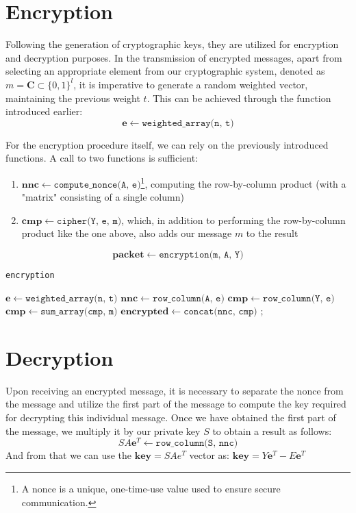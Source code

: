 %
\section{Encryption}

Following the generation of cryptographic keys, they are utilized for encryption and decryption purposes. In the transmission of encrypted messages, apart from selecting an appropriate element from our cryptographic system, denoted as $m = \mathbf{C} \subset \{0,1\}^l $, it is imperative to generate a random weighted vector, maintaining the previous weight $t$. This can be achieved through the function introduced earlier:
$$
\mathbf{e}\leftarrow\texttt{weighted\_array(n, t)}
$$

For the encryption procedure itself, we can rely on the previously introduced functions. A call to two functions is sufficient:
\begin{enumerate}
    \item $\mathbf{nnc} \leftarrow\texttt{compute\_nonce(A, e)}$\footnote{A nonce is a unique, one-time-use value used to ensure secure communication.}, computing the row-by-column product (with a "matrix" consisting of a single column)
    \item $\mathbf{cmp} \leftarrow\texttt{cipher(Y, e, m)}$, which, in addition to performing the row-by-column product like the one above, also adds our message $m$ to the result
\end{enumerate}
$$
\mathbf{packet} \leftarrow\texttt{encryption(m, A, Y)}
$$

\begin{algorithm}[H]
\caption{\texttt{encryption}}
\label{enc}

\DontPrintSemicolon
\SetStartEndCondition{ }{}{}
\AlgoDontDisplayBlockMarkers\SetAlgoNoEnd\SetAlgoNoLine

$\mathbf{e} \leftarrow \texttt{weighted\_array(n, t)}$\;
$\mathbf{nnc} \leftarrow \texttt{row\_column(A, e)}$\;
$\mathbf{cmp} \leftarrow \texttt{row\_column(Y, e)}$\;
$\mathbf{cmp} \leftarrow \texttt{sum\_array(cmp, m)}$\;
$\mathbf{encrypted} \leftarrow \texttt{concat(nnc, cmp)}$ 
;
\end{algorithm}

%
\section{Decryption}
Upon receiving an encrypted message, it is necessary to separate the nonce from the message and utilize the first part of the message to compute the key required for decrypting this individual message. Once we have obtained the first part of the message, we multiply it by our private key $S$ to obtain a result as follows:
$$
SA\mathbf{e}^T\leftarrow \texttt{row\_column(S, nnc)}
$$
And from that we can use the \(\mathbf{key} = SAe^T\) vector as: $\mathbf{key} = Y\mathbf{e}^T - E\mathbf{e}^T$

